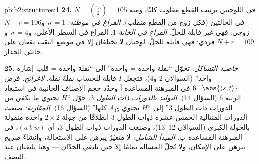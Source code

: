 \begin{solution}{pb:b2:structures:1}
\textbf{24.} في اللوحتين ترتيب القطع مقلوب كليًا،
ومنه $N = \binom{15}{2} = 105$ في الحالتين (فكل زوج من القطع
منقلب). \emph{الفراغ في موطنه:} $r = 1$، و$N + r = 106$ زوجي:
فهي غير قابلة للحلّ. \emph{الفراغ في الخانة $1$:} الفراغ في السطر
الأعلى، و$r = 4$، و$N + r = 109$ فردي: فهي قابلة للحلّ. لوحتان لا تختلفان
إلا في موضع الثقب تقعان على جانبَي الجدار.

\textbf{25.} \emph{خاصية التشاكل:} تحوّل ``نقلة واحدة =
 واحدة'' إلى ``نقلة واحدة = قلب إشارة واحد'' (السؤالان
2 و4)، فتجعل $I$ قابلة للحساب نقلةً نقلة. \emph{لاغرانج:} فرض
$6 \mid \abs{\langle s, t\rangle}$ في المبرهنة المساعدة أ وحدّد
حجم الأصناف الجانبية في استبعاد الرتبة $6$ (السؤال 14).
\emph{التوليد بالدورات ذات الطول $3$:} حوّل ``$H$ تحتوي
ما يكفي من الدورات ذات الطول $3$'' إلى ``$H$ تحتوي $A_{15}$ كلها''
(السؤال 16). \emph{المقارنة:} صنعت الدورات المتتالية
الخمس عشرة ذوات الطول $3$ انطلاقًا من جولة $2 \times 2$ واحدة
منقولة بالجولة الكبرى (السؤالان 12--13)، وصنعت
الدورات ذوات الطول $3$، أي $(a\ b\ w)$، في المبرهنة المساعدة ب. \emph{المبدأ الشامل:}
لا متغيّرٌ يبرهن على الاستحالة، وإنشاءٌ صريح يبرهن على
الإمكان، ولا تُحلّ المسألة تمامًا إلا حين يلتقي الحدّان
--- وهنا يلتقيان عند النصف.
\end{solution}
